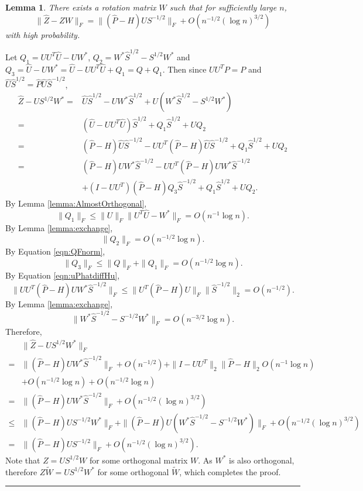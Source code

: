 \documentclass[a4paper]{article}
\newenvironment{proof}{{\bf Proof:  }}{\hfill\rule{2mm}{2mm}}
\newtheorem{lemma}[fact]{Lemma}
\begin{document}
\begin{lemma}
\label{lemma:XhatDiffXWexpression}
There exists a rotation matrix $W$ such that for sufficiently large $n$,
\[
	\|\hat{Z} - Z W\|_F = \| (\hat{P} - H) U S^{-1/2} \|_F + O(n^{-1/2} (\log n)^{3/2})
\]
with high probability.
\end{lemma}
\begin{proof}
Let $Q_1 = U U^T \hat{U} - U W^*$, $Q_2 = W^* \hat{S}^{1/2} - S^{1/2} W^*$ and $Q_3 = \hat{U} - U W^* = \hat{U} - U U^T \hat{U} + Q_1 = Q + Q_1$. Then since $U U^T P = P$ and $\hat{U} \hat{S}^{1/2} = \hat{P} \hat{U} \hat{S}^{-1/2}$,
\begin{align*}
	\hat{Z} - U S^{1/2} W^*
    = & \hat{U} \hat{S}^{1/2} - U W^* \hat{S}^{1/2} + U(W^* \hat{S}^{1/2} - S^{1/2} W^*) \\
    = & (\hat{U} - U U^T \hat{U}) \hat{S}^{1/2} + Q_1 \hat{S}^{1/2} + U Q_2 \\
    = & (\hat{P} - H) \hat{U} \hat{S}^{-1/2} - U U^T(\hat{P} - H)\hat{U}\hat{S}^{-1/2} + Q_1 \hat{S}^{1/2} + U Q_2 \\
    = & (\hat{P} - H) U W^* \hat{S}^{-1/2} - U U^T(\hat{P} - H)U W^*\hat{S}^{-1/2} \\
    & + (I - U U^T)(\hat{P} - H) Q_3 \hat{S}^{-1/2} + Q_1 \hat{S}^{1/2} + U Q_2.
\end{align*}
By Lemma \ref{lemma:AlmostOrthogonal},
\[
	\|Q_1\|_F \le \| U\|_F \| U^T \hat{U} - W^* \|_F = O(n^{-1} \log n).
\]
By Lemma \ref{lemma:exchange},
\[
	\|Q_2\|_F = O(n^{-1/2} \log n).
\]
By Equation \ref{eqn:QFnorm},
\[
	\|Q_3\|_F \le \|Q\|_F + \|Q_1\|_F = O(n^{-1/2} \log n).
\]
By Equation \ref{eqn:uPhatdiffHu},
\[
	\| U U^T(\hat{P} - H)U W^*\hat{S}^{-1/2} \|_F
    \le \| U^T(\hat{P} - H)U \|_F \| \hat{S}^{-1/2} \|_2
    = O(n^{-1/2}).
\]
By Lemma \ref{lemma:exchange},
\[
	\| W^* \hat{S}^{-1/2} - S^{-1/2} W^* \|_F = O(n^{-3/2} \log n).
\]
Therefore,
\begin{align*}
	& \| \hat{Z} - U S^{1/2} W^* \|_F \\
    = & \| (\hat{P} - H) U W^* \hat{S}^{-1/2} \|_F + O(n^{-1/2})
    + \|I - U U^T \|_2 \| \hat{P} - H \|_2 O(n^{-1} \log n) \\
    & + O(n^{-1/2} \log n) + O(n^{-1/2} \log n) \\
    = & \| (\hat{P} - H) U W^* \hat{S}^{-1/2} \|_F + O(n^{-1/2} (\log n)^{3/2}) \\
    \le & \| (\hat{P} - H) U S^{-1/2} W^* \|_F + \|(\hat{P} - H) U (W^* \hat{S}^{-1/2} - S^{-1/2} W^*) \|_F + O(n^{-1/2} (\log n)^{3/2}) \\
    = & \| (\hat{P} - H) U S^{-1/2}\|_F + O(n^{-1/2} (\log n)^{3/2}).
\end{align*}
Note that $Z = U S^{1/2} W$ for some orthogonal matrix $W$. As $W^*$ is also orthogonal, therefore $Z \tilde{W} = U S^{1/2} W^*$ for some orthogonal $\tilde{W}$, which completes the proof.
\end{proof}
\end{document}
